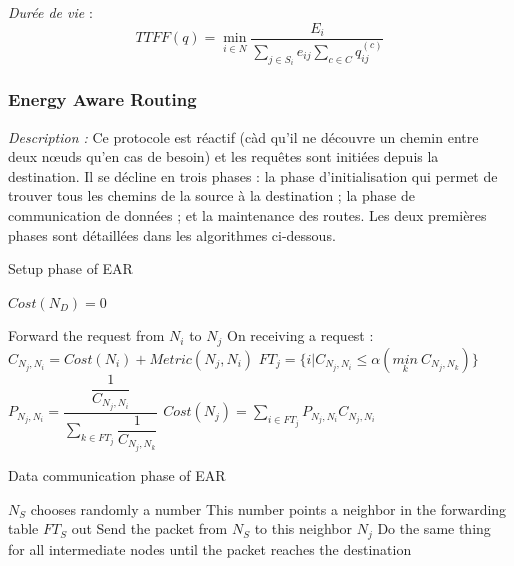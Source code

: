 \emph{Durée de vie} :  $$TTFF(q) = \min\limits_{i \in N}\frac{E_i}{\sum \limits_{j \in S_i} {e_{ij}} \sum \limits_{c \in C} {q_{ij}^{(c)}}}$$



\subsubsection{Energy Aware Routing \cite{Shah2002}}

\emph{Description :}
Ce protocole est réactif (càd qu'il ne découvre un chemin entre deux nœuds qu’en cas de besoin) et les requêtes sont initiées depuis la destination. Il se décline en trois phases : la phase d'initialisation qui permet de trouver tous les chemins de la source à la destination ; la phase de communication de données ; et la maintenance des routes. Les deux premières phases sont détaillées dans les algorithmes ci-dessous.

\begin{algorithm}[H]
\caption{Setup phase of EAR}
\label{algo_EAR_sp}
\begin{algorithmic}

\STATE $Cost(N_D) = 0$

			\STATE Forward the request from $N_i$ to $N_j$
		\ENDIF
	\ENDFOR
\ENDFOR
\STATE
{}
		\STATE On receiving a request :
		\STATE $C_{N_j,N_i} = Cost(N_i)+Metric(N_j,N_i)$
		\STATE $FT_j = \{i | C_{N_j,N_i} \leq \alpha (\underset{k}{min}\ C_{N_j,N_k})\}$
		\STATE
		\STATE $P_{N_j,N_i} = \dfrac{\dfrac{1}{C_{N_j,N_i}}}{\sum \limits_{k \in FT_j} \dfrac{1}{C_{N_j,N_k}}}$
		\STATE
		\STATE $Cost(N_j) = \sum \limits_{i \in FT_j} {P_{N_j,N_i} C_{N_j,N_i}}$
	\ENDFOR
\ENDFOR
\end{algorithmic}
\end{algorithm}


\begin{algorithm}[H]
\caption{Data communication phase of EAR}
\label{algo_EAR_dcp}
\begin{algorithmic}

\STATE $N_S$ chooses randomly a number
\STATE This number points a neighbor in the forwarding table $FT_S$ out
\STATE Send the packet from $N_S$ to this neighbor $N_j$
\STATE Do the same thing for all intermediate nodes until the packet reaches the destination

\end{algorithmic}
\end{algorithm}



